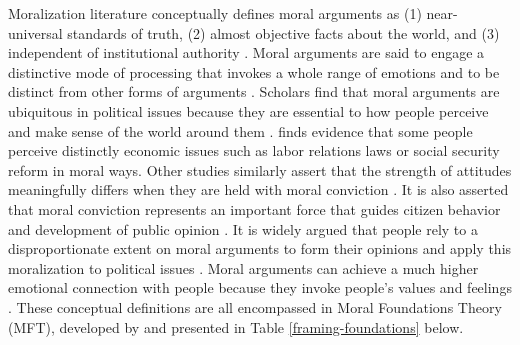 \documentclass[12pt,]{article}
\begin{document}
Moralization literature conceptually defines moral arguments as (1)
near-universal standards of truth, (2) almost objective facts about the
world, and (3) independent of institutional authority
\citep{skitka_psychology_2010}. Moral arguments are said to engage a
distinctive mode of processing that invokes a whole range of emotions
and to be distinct from other forms of arguments
\citep{ryan_reconsidering_2014}. Scholars find that moral arguments are
ubiquitous in political issues because they are essential to how people
perceive and make sense of the world around them
\citep{frank_whats_2005, mooney_public_2001, tatalovich_moral_1994}.
\citet{ryan_reconsidering_2014} finds evidence that some people perceive
distinctly economic issues such as labor relations laws or social
security reform in moral ways. Other studies similarly assert that the
strength of attitudes meaningfully differs when they are held with moral
conviction
\citep{baron_protected_1997, bennis_costs_2010, ditto_motivated_2009, tetlock_correspondence_2003}.
It is also asserted that moral conviction represents an important force
that guides citizen behavior and development of public opinion
\citep{converse_nature_1964, skitka_moral_2005, skitka_moral_2011, smith_typologies_2002, tatalovich_moral_2011, zaller_nature_1992}.
It is widely argued that people rely to a disproportionate extent on
moral arguments to form their opinions and apply this moralization to
political issues
\citep{ryan_no_2014, ryan_reconsidering_2014, smith_typologies_2002}.
Moral arguments can achieve a much higher emotional connection with
people because they invoke people's values and feelings
\citep{skitka_moral_2005, skitka_moral_2011, haidt_moral_2003, tatalovich_moral_2011}.
These conceptual definitions are all encompassed in Moral Foundations
Theory (MFT), developed by \citet{haidt_2012_righteous} and presented in
Table \ref{framing-foundations} below.

\begin{table}[H]
\caption{Foundations of Moral Arguments}
\centering
{}
\label{framing-foundations}
\end{table}
\end{document}
